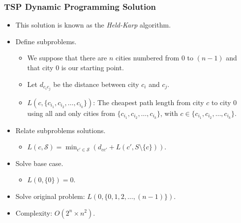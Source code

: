 \documentclass{beamer}
\begin{document}
\begin{frame}%
\frametitle{TSP Dynamic Programming Solution}

\footnotesize

\begin{itemize}

\item This solution is known as the \emph{Held-Karp} algorithm.

\vspace{0.1cm}

\item<2-> Define subproblems.
\begin{itemize}
\footnotesize
\item<2-> We suppose that there are $n$ cities numbered from $0$ to $(n-1)$ and that city $0$ is our starting point.
\vspace{0.05cm}
\item<2-> Let $d_{c_ic_j}$ be the distance between city $c_i$ and $c_j$.
\vspace{0.05cm}
\item<3-> $L(c, \{c_{i_1}, c_{i_2}, \ldots, c_{i_k}\})$: The cheapest path length from city $c$ to city $0$ using all and only
cities from $\{c_{i_1}, c_{i_2}, \ldots, c_{i_k}\}$, with $c \in \{c_{i_1}, c_{i_2}, \ldots, c_{i_k}\}$.
\end{itemize}

\vspace{0.1cm}

\item<4-> Relate subproblems solutions.
\begin{itemize}
\footnotesize
\item<4-> $L(c, \mathcal{S}) = \min_{c' \in \mathcal{S}} (d_{cc'} + L(c', S \setminus \{c\}))$.
\end{itemize}

\vspace{0.1cm}

\item<5-> Solve base case.
\begin{itemize}
\footnotesize
\item<5-> $L(0, \{0\}) = 0$.
\end{itemize}

\vspace{0.1cm}


\item<6-> Solve original problem: $L(0, \{0, 1, 2, \ldots, (n - 1)\})$.

\vspace{0.1cm}

\item<7-> Complexity: $O(2^n\times n^2)$.
\end{itemize}

\end{frame}
\end{document}
